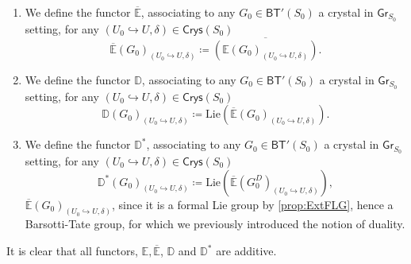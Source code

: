 \begin{defn}[]\leavevmode\vspace{-.2\baselineskip}
\begin{enumerate}
\item We define the functor $\overline{\mathbb{E}}$, associating to
	any $G_0 \in \mathsf{BT}'(S_0)$ a crystal in $\mathsf{Gr}_{S_0}$
	setting, for any $\left(U_0 \hookrightarrow U, \delta\right) \in \mathsf{Crys}(S_0)$
	\begin{equation*}
		\overline{\mathbb{E}}(G_0)_{\left(U_0 \hookrightarrow U, \delta\right)} \coloneqq
		\overline{\left( \mathbb{E}(G_0)_{\left(U_0 \hookrightarrow U, \delta\right)} \right)}
	.\end{equation*}

\item We define the functor $\mathbb{D}$, associating to
	any $G_0 \in \mathsf{BT}'(S_0)$ a crystal in $\mathsf{Gr}_{S_0}$
	setting, for any $\left(U_0 \hookrightarrow U, \delta\right) \in \mathsf{Crys}(S_0)$
	\begin{equation*}
		\mathbb{D}(G_0)_{\left(U_0 \hookrightarrow U, \delta\right)} \coloneqq
		\mathrm{Lie}
		\left( \overline{\mathbb{E}}(G_0)_{\left(U_0 \hookrightarrow U, \delta\right)} \right)
	.\end{equation*}

\item We define the functor $\mathbb{D}^*$, associating to
	any $G_0 \in \mathsf{BT}'(S_0)$ a crystal in $\mathsf{Gr}_{S_0}$
	setting, for any $\left(U_0 \hookrightarrow U, \delta\right) \in \mathsf{Crys}(S_0)$
	\begin{equation*}
		\mathbb{D}^*(G_0)_{\left(U_0 \hookrightarrow U, \delta\right)} \coloneqq
		\mathrm{Lie}
		\left( \overline{\mathbb{E}}(G_0^D)_{\left(U_0 \hookrightarrow U, \delta\right)} \right)
	,\end{equation*}
	$\overline{\mathbb{E}}(G_0)_{\left(U_0 \hookrightarrow U, \delta\right)}$, 
	since it is a formal Lie group by \cref{prop:ExtFLG}, hence a Barsotti-Tate group,
	for which we previously introduced the notion of duality.
\end{enumerate}
\end{defn}


\begin{rem}[]
	It is clear that all functors, $\mathbb{E}, \overline{\mathbb{E}}$,
	$\mathbb{D}$ and $\mathbb{D}^*$ are additive.
\end{rem}


